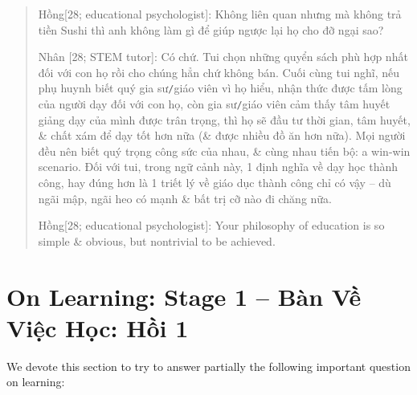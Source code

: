 \documentclass[12pt,twoside]{book}
\begin{document}
\begin{quote}
	{\sf Hồng[28; educational psychologist]}: Không liên quan nhưng mà không trả tiền Sushi thì anh không làm gì để giúp ngược lại họ cho đỡ ngại sao?
	
	{\sf Nhân [28; STEM tutor]}: Có chứ. Tui chọn những quyển sách phù hợp nhất đối với con họ rồi cho chúng hẳn chứ không bán. Cuối cùng tui nghĩ, nếu phụ huynh biết quý gia sư{\tt/}giáo viên vì họ hiểu, nhận thức được tấm lòng của người dạy đối với con họ, còn gia sư{\tt/}giáo viên cảm thấy tâm huyết giảng dạy của mình được trân trọng, thì họ sẽ đầu tư thời gian, tâm huyết, \& chất xám để dạy tốt hơn nữa (\& được nhiều đồ ăn hơn nữa). Mọi người đều nên biết quý trọng công sức của nhau, \& cùng nhau tiến bộ: a win-win scenario. Đối với tui, trong ngữ cảnh này, 1 định nghĩa về dạy học thành công, hay đúng hơn là 1 triết lý về giáo dục thành công chỉ có vậy -- dù ngãi mập, ngãi heo có mạnh \& bất trị cỡ nào đi chăng nữa.
	
	{\sf Hồng[28; educational psychologist]}: Your philosophy of education is so simple \& obvious, but nontrivial to be achieved.
\end{quote}


\chapter{On Learning: Stage 1 -- Bàn Về Việc Học: Hồi 1}
\label{sect: learning}
\minitoc
We devote this section to try to answer partially the following important question on learning:
\end{document}
